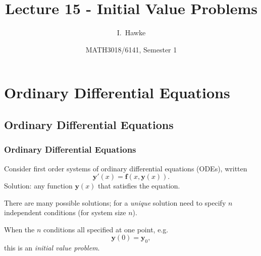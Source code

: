\documentclass{beamer}
\title[Lecture 15] %
{Lecture 15 - Initial Value Problems}
\author[I. Hawke] %
{I.~Hawke}
\institute[University of Southampton] %
{
  School of Mathematics, \\
  University of Southampton, UK
}
\date[Semester 1] %
{MATH3018/6141, Semester 1}
\newcommand{\by}{{\boldsymbol{y}}}
\newcommand{\bfm}[1]{{\boldsymbol{#1}}}
\begin{document}
\begin{frame}
  \titlepage
\end{frame}

\section{Ordinary Differential Equations}

\subsection{Ordinary Differential Equations}

\begin{frame}
  \frametitle{Ordinary Differential Equations}

  Consider first order systems of ordinary differential
  equations (ODEs), written
  \begin{equation*}
    \by'(x) = \bfm{f}(x, \by(x)).
  \end{equation*}
  Solution: any function $\by(x)$ that satisfies the equation. \pause

  \vspace{1ex}

  There are many possible solutions; for a \emph{unique} solution need
  to specify $n$ independent conditions (for system size $n$). \pause

  \vspace{1ex}

  When the $n$ conditions all specified at one point, e.g.
  \begin{equation*}
    \by(0) = \by_0,
  \end{equation*}
  this is an \emph{initial value problem}.

\end{frame}
\end{document}
